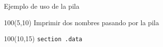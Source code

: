 \documentclass[aspectratio=169]{beamer}
\begin{document}
\begin{frame}[fragile]{Ejemplo de uso de la pila}
    \begin{textblock}{100}(5,10) \small Imprimir dos nombres pasando por la pila \end{textblock}
    \begin{textblock}{100}(10,15)
    \scriptsize
    \verb|section .data                      |\\

\end{textblock}
\end{frame}
\end{document}
